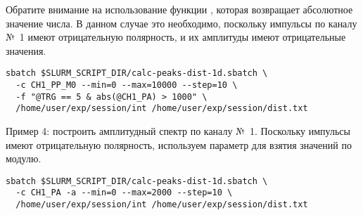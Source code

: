 Обратите внимание на использование функции , которая возвращает абсолютное значение числа. В данном случае это необходимо, поскольку импульсы по каналу №~1 имеют отрицательную полярность, и их амплитуды имеют отрицательные значения.

\begin{lstlisting}
sbatch $SLURM_SCRIPT_DIR/calc-peaks-dist-1d.sbatch \
  -c CH1_PP_M0 --min=0 --max=10000 --step=10 \
  -f "@TRG == 5 & abs(@CH1_PA) > 1000" \
  /home/user/exp/session/int /home/user/exp/session/dist.txt
\end{lstlisting}

\bigskip
Пример 4: построить амплитудный спектр по каналу №~1. Поскольку импульсы имеют отрицательную полярность, используем параметр  для взятия значений по модулю.

\begin{lstlisting}
sbatch $SLURM_SCRIPT_DIR/calc-peaks-dist-1d.sbatch \
  -c CH1_PA -a --min=0 --max=2000 --step=10 \
  /home/user/exp/session/int /home/user/exp/session/dist.txt
\end{lstlisting}
